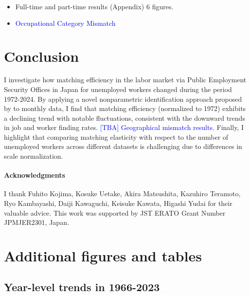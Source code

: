 \documentclass[12pt]{article}
\begin{document}
\begin{itemize}
    \item Full-time and part-time results (Appendix) 6 figures.
    \item \textcolor{blue}{Occupational Category Mismatch}
\end{itemize}





\section{Conclusion}

I investigate how matching efficiency in the labor market via Public Employment Security Offices in Japan for unemployed workers changed during the period 1972-2024. By applying a novel nonparametric identification approach proposed by \cite{lange2020beyond} to monthly data, I find that matching efficiency (normalized to 1972) exhibits a declining trend with notable fluctuations, consistent with the downward trends in job and worker finding rates. \textcolor{blue}{[TBA] Geographical mismatch results.} Finally, I highlight that comparing matching elasticity with respect to the number of unemployed workers across different datasets is challenging due to differences in scale normalization.


\paragraph{Acknowledgments}
I thank Fuhito Kojima, Kosuke Uetake, Akira Matsushita, Kazuhiro Teramoto, Ryo Kambayashi, Daiji Kawaguchi, Keisuke Kawata, Higashi Yudai for their valuable advice. This work was supported by JST ERATO Grant Number JPMJER2301, Japan.






\newpage

\appendix
\section{Additional figures and tables}\label{sec:year_data}
\subsection{Year-level trends in 1966-2023}
\end{document}
